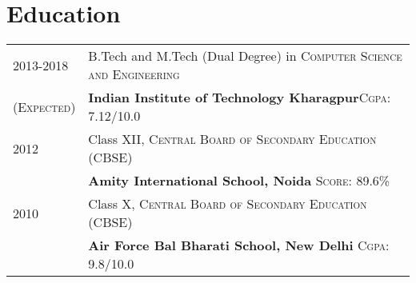 \documentclass[a4paper,10pt]{extarticle} %
\begin{document}



\section{Education}

\begin{tabular}{R{3.0cm}|p{15.0cm}}	
2013-2018 & B.Tech and M.Tech (Dual Degree) in \textsc{Computer Science and Engineering}\\
\textsc{(Expected)}&\textbf{Indian Institute of Technology Kharagpur}\hfill\textsc{Cgpa}: 7.12/10.0\\



2012& Class XII, \textsc{}\textsc{Central Board of Secondary Education (CBSE)} \\
&\normalsize\textbf{Amity International School, Noida} \hfill\textsc{Score}: 89.6\%\\



2010 & Class X, \textsc{}\textsc{Central Board of Secondary Education (CBSE)} \\
&\normalsize\textbf{Air Force Bal Bharati School, New Delhi} \hfill\textsc{Cgpa}: 9.8/10.0\\

\end{tabular}
\end{document}
